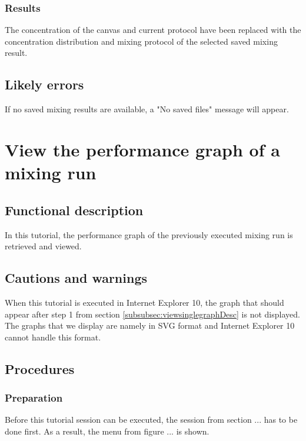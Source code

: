 \subsubsection{Results}
The concentration of the canvas and current protocol have been replaced with the concentration distribution and mixing protocol of the selected saved mixing result.

\subsection{Likely errors}
If no saved mixing results are available, a "No saved files" message will appear. 




\section{View the performance graph of a mixing run}\label{sec:viewsinglegraph}

\subsection{Functional description}
In this tutorial, the performance graph of the previously executed mixing run is retrieved and viewed.

\subsection{Cautions and warnings}
When this tutorial is executed in Internet Explorer 10, the graph that should appear after step 1 from section  \ref{subsubsec:viewsinglegraphDesc} is not displayed. The graphs that we display are namely in SVG format and Internet Explorer 10 cannot handle this format.

\subsection{Procedures}

\subsubsection{Preparation}
Before this tutorial session can be executed, the session from section ... has to be done first. As a result, the menu from figure ... is shown.

